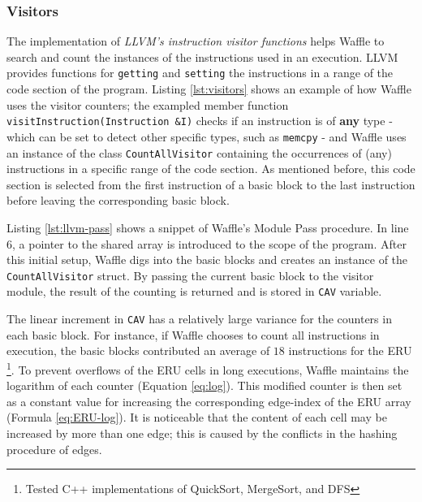 \subsubsection{Visitors}

The implementation of \textit{LLVM's instruction visitor functions} \cite{inst_visitor} helps Waffle to search and count the instances of the instructions used in an execution. LLVM provides functions for \texttt{getting} and \texttt{setting} the instructions in a range of the code section of the program. Listing \ref{lst:visitors} shows an example of how Waffle uses the visitor counters; the exampled member function \texttt{visitInstruction(Instruction \&I)} checks if an instruction is of \textbf{any} type - which can be set to detect other specific types, such as \texttt{memcpy} - and Waffle uses an instance of the class \texttt{CountAllVisitor} containing the occurrences of (any) instructions in a specific range of the code section. As mentioned before, this code section is selected from the first instruction of a basic block to the last instruction before leaving the corresponding basic block.




Listing \ref{lst:llvm-pass} shows a snippet of Waffle's Module Pass procedure. In line 6, a pointer to the shared array is introduced to the scope of the program. After this initial setup, Waffle digs into the basic blocks and creates an instance of the \texttt{CountAllVisitor} struct. By passing the current basic block to the visitor module, the result of the counting is returned and is stored in \texttt{CAV} variable.




The linear increment in \texttt{CAV} has a relatively large variance for the counters in each basic block. For instance, if Waffle chooses to count all instructions in execution, the basic blocks contributed an average of $18$ instructions for the ERU \footnote{Tested C++ implementations of QuickSort, MergeSort, and DFS}. To prevent overflows of the ERU cells in long executions, Waffle maintains the logarithm of each counter (Equation \ref{eq:log}). This modified counter is then set as a constant value for increasing the corresponding edge-index of the ERU array (Formula \ref{eq:ERU-log}). It is noticeable that the content of each cell may be increased by more than one edge; this is caused by the conflicts in the hashing procedure of edges.

